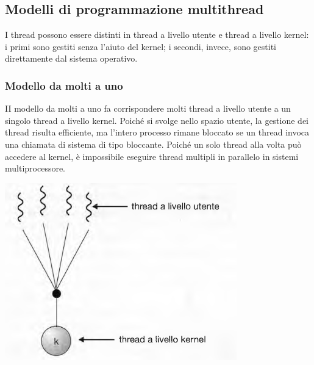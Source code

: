 \documentclass[11pt,a4paper]{article}
\begin{document}
\subsection{Modelli di programmazione multithread}
I thread possono essere distinti in thread a livello utente e thread a livello kernel: i primi so­no gestiti senza l'aiuto del kernel; i secondi, invece, sono gestiti direttamente dal sistema
operativo.

\subsubsection{Modello da molti a uno}
II modello da molti a uno fa corrispondere molti thread a livello utente a un
singolo thread a livello kernel. Poiché si svolge nello spazio utente, la gestione dei thread ri­sulta efficiente, ma l'intero processo rimane bloccato se un thread invoca una chiamata di si­stema di tipo bloccante. Poiché un solo thread alla volta può accedere al kernel, è
impossibile eseguire thread multipli in parallelo in sistemi multiprocessore.
\begin{center}
  \includegraphics[scale=0.45]{img/0012.png}
\end{center}
\end{document}
